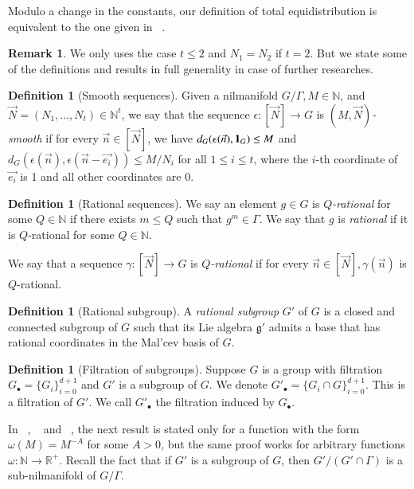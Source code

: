\documentclass[12pt,amstex]{amsart}
\theoremstyle{definition}
\newtheorem{defn}[thm]{Definition}
\newtheorem{rem}[thm]{Remark}
\def \e {\epsilon}
\begin{document}
Modulo a change in the constants, our definition of total equidistribution is equivalent
to the one given in ~\cite{GT}.

\begin{rem}
 We only uses the case $t\leq 2$ and $N_{1}=N_{2}$ if $t=2$. But we state some of the definitions and results in 
full generality in case of further researches.
\end{rem}


\begin{defn}[Smooth sequences]
  Given a nilmanifold $G/\Gamma, M\in\mathbb{N}$, and $\vec{N}=(N_{1},\dots,N_{t})\in\mathbb{N}^{t}$, we say that the sequence $\e\colon[\vec{N}]\rightarrow G$ is \emph{$(M,\vec{N})$-smooth} if for every $\vec{n}\in[\vec{N}]$, we have $d_{G}(\e(\vec{n}),\bold{1}_{G})\leq M$ and $d_{G}(\e(\vec{n}),\e(\vec{n}-\vec{e_{i}}))\leq M/N_{i}$ for all $1\leq i\leq t$, where the $i$-th coordinate of $\vec{e_{i}}$ is 1 and all other coordinates are 0.
\end{defn}

\begin{defn}[Rational sequences]
  We say an element $g\in G$ is \emph{$Q$-rational} for some $Q\in\mathbb{N}$ if there exists $m\leq Q$ such that $g^{m}\in\Gamma$. We say that $g$ is \emph{rational} if it is $Q$-rational for some $Q\in\mathbb{N}$.

  We say that a sequence $\gamma\colon[\vec{N}]\rightarrow G$ is \emph{$Q$-rational} if for every $\vec{n}\in[\vec{N}], \gamma(\vec{n})$ is $Q$-rational.
\end{defn}

\begin{defn}[Rational subgroup]
A \emph{rational subgroup} $G'$ of $G$ is a closed and connected subgroup of $G$ such
that its Lie algebra $\mathfrak{g}'$ admits a base that has rational coordinates in the Mal'cev basis
of $G$.
\end{defn}

\begin{defn}[Filtration of subgroups]
Suppose $G$ is a group with filtration $G_{\bullet}=\{G_{i}\}_{i=0}^{d+1}$ and $G'$ is a subgroup of $G$. We denote $G'_{\bullet}=\{G_{i}\cap G\}_{i=0}^{d+1}$. This is a filtration of $G'$. We call $G'_{\bullet}$ the filtration induced by $G_{\bullet}$.
\end{defn}

In ~\cite{er}, ~\cite{er2} and ~\cite{GT}, the next result is stated only for a function with the form $\omega(M)=M^{-A}$ for some $A>0$, but the same proof works for arbitrary functions $\omega\colon\mathbb{N}\rightarrow\mathbb{R}^{+}$. Recall the fact that if $G'$ is a subgroup of $G$, then $G'/(G'\cap\Gamma)$ is a sub-nilmanifold of $G/\Gamma$.
\end{document}
